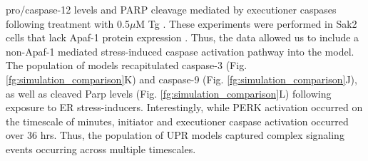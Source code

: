 \documentclass[fleqn,10pt]{wlscirep}
\begin{document}
pro/caspase-12 levels and PARP cleavage mediated by executioner caspases following treatment with 0.5$\mu$M Tg \cite{rao2002cer}. These experiments were performed in Sak2 cells that lack Apaf-1 protein expression \cite{rao2002cer}. Thus, the data allowed us to include a non-Apaf-1 mediated stress-induced caspase activation pathway into the model. The population of models recapitulated caspase-3 (Fig. \ref{fg:simulation_comparison}K) and caspase-9 (Fig. \ref{fg:simulation_comparison}J), as well as cleaved Parp levels (Fig. \ref{fg:simulation_comparison}L) following exposure to ER stress-inducers. Interestingly, while PERK activation occurred on the timescale of minutes, initiator and executioner caspase activation occurred over 36 hrs. Thus, the population of UPR models captured complex signaling events occurring across multiple timescales. 
\end{document}
